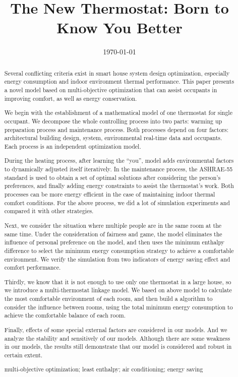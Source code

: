 \documentclass{mcmthesis}
\title{The New Thermostat: Born to Know You Better}
\author{}
\date{\today}
\begin{document}
	\begin{abstract}
		
		Several conflicting criteria exist in smart house system design optimization, especially energy consumption and indoor environment thermal performance. This paper presents a novel model based on multi-objective optimization that can assist occupants in improving comfort, as well as energy conservation.
		
		We begin with the establishment of a mathematical model of one thermostat for single occupant. We decompose the whole controlling process into two parts: warming up preparation process and maintenance process. Both processes depend on four factors: architectural building design, system, environmental real-time data and occupants. Each process is an independent optimization model. 
		
		During the heating process, after learning the “you”, model adds environmental factors to dynamically adjusted itself iteratively. In the maintenance process, the ASHRAE-55 standard is used to obtain a set of optimal solutions after considering the person's preferences, and finally adding energy constraints to assist the thermostat's work. Both processes can be more energy efficient in the case of maintaining indoor thermal comfort conditions. For the above process, we did a lot of simulation experiments and compared it with other strategies.
		
		Next, we consider the situation where multiple people are in the same room at the same time. Under the consideration of fairness and game, the model eliminates the influence of personal preference on the model, and then uses the minimum enthalpy difference to select the minimum energy consumption strategy to achieve a comfortable environment. We verify the simulation from two indicators of energy saving effect and comfort performance.
		
		Thirdly, we know that it is not enough to use only one thermostat in a large house, so we introduce a multi-thermostat linkage model. We based on above model to calculate the most comfortable environment of each room, and then build a algorithm to consider the influence between rooms, using the total minimum energy consumption to achieve the comfortable balance of each room.
		
		Finally, effects of some special external factors are considered in our models. And we analyze the stability and sensitively of our models. Although there are some weakness in our models, the results still demonstrate that our model is considered and robust in certain extent.
		
		\begin{keywords}
			multi-objective optimization; least enthalpy; air conditioning; energy saving
		\end{keywords}
	\end{abstract}
\end{document}
